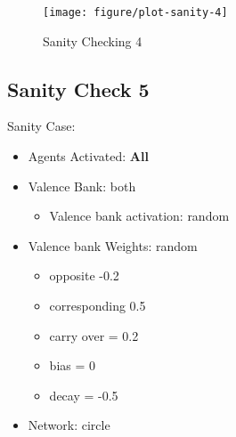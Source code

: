 \documentclass{article}\usepackage[]{graphicx}\usepackage[]{color}
\makeatletter
\def\maxwidth{ %
  \ifdim\Gin@nat@width>\linewidth
    \linewidth
  \else
    \Gin@nat@width
  \fi
}
\newenvironment{knitrout}{}{} %
\makeatother
\begin{document}
\begin{knitrout}
\begin{figure}[]
\texttt{[image: figure/plot-sanity-4]} \caption[Sanity Checking 4]{Sanity Checking 4\label{fig:plot-sanity-4}}
\end{figure}


\end{knitrout}


\newpage
\subsection{Sanity Check 5}
\label{sec:sanity5}
Sanity Case:
\begin{itemize}
  \item Agents Activated: \textbf{All}
  \item Valence Bank: both
  \begin{itemize}
      \item Valence bank activation: random
  \end{itemize}
  \item Valence bank Weights: random
  \begin{itemize}
      \item opposite -0.2
      \item corresponding 0.5
      \item carry over = 0.2
      \item bias = 0
      \item decay = -0.5
  \end{itemize}
  \item Network: circle
\end{itemize}
\end{document}
